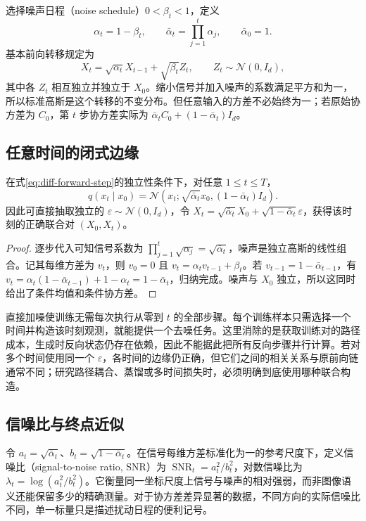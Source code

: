 \documentclass[UTF8,12pt,a4paper,fontset=fandol]{ctexart}
\begin{document}
选择噪声日程（noise schedule）$0<\beta_t<1$，定义
\begin{equation}
 \alpha_t=1-\beta_t,\qquad \bar\alpha_t=\prod_{j=1}^{t}\alpha_j,\qquad \bar\alpha_0=1.
 \label{eq:diff-schedule}
\end{equation}
基本前向转移规定为
\begin{equation}
 X_t=\sqrt{\alpha_t}X_{t-1}+\sqrt{\beta_t}Z_t,
 \qquad Z_t\sim\mathcal N(0,I_d),
 \label{eq:diff-forward-step}
\end{equation}
其中各 $Z_t$ 相互独立并独立于 $X_0$。缩小信号并加入噪声的系数满足平方和为一，所以标准高斯是这个转移的不变分布。但任意输入的方差不必始终为一；若原始协方差为 $C_0$，第 $t$ 步协方差实际为 $\bar\alpha_t C_0+(1-\bar\alpha_t)I_d$。

\subsection{任意时间的闭式边缘}
\begin{proposition}[直接加噪公式]
\label{prop:diff-forward-marginal}
在式\eqref{eq:diff-forward-step}的独立性条件下，对任意 $1\leq t\leq T$，
\begin{equation}
 q(x_t\mid x_0)=\mathcal N(x_t;\sqrt{\bar\alpha_t}x_0,(1-\bar\alpha_t)I_d).
 \label{eq:diff-forward-marginal}
\end{equation}
因此可直接抽取独立的 $\varepsilon\sim\mathcal N(0,I_d)$，令 $X_t=\sqrt{\bar\alpha_t}X_0+\sqrt{1-\bar\alpha_t}\varepsilon$，获得该时刻的正确联合对 $(X_0,X_t)$。
\end{proposition}
\begin{proof}
逐步代入可知信号系数为 $\prod_{j=1}^{t}\sqrt{\alpha_j}=\sqrt{\bar\alpha_t}$，噪声是独立高斯的线性组合。记其每维方差为 $v_t$，则 $v_0=0$ 且 $v_t=\alpha_t v_{t-1}+\beta_t$。若 $v_{t-1}=1-\bar\alpha_{t-1}$，有 $v_t=\alpha_t(1-\bar\alpha_{t-1})+1-\alpha_t=1-\bar\alpha_t$，归纳完成。噪声与 $X_0$ 独立，所以这同时给出了条件均值和条件协方差。
\end{proof}

直接加噪使训练无需每次执行从零到 $t$ 的全部步骤。每个训练样本只需选择一个时间并构造该时刻观测，就能提供一个去噪任务。这里消除的是获取训练对的路径成本，生成时反向状态仍存在依赖，因此不能据此把所有反向步骤并行计算。若对多个时间使用同一个 $\varepsilon$，各时间的边缘仍正确，但它们之间的相关关系与原前向链通常不同；研究路径耦合、蒸馏或多时间损失时，必须明确到底使用哪种联合构造。

\subsection{信噪比与终点近似}
令 $a_t=\sqrt{\bar\alpha_t}$、$b_t=\sqrt{1-\bar\alpha_t}$。在信号每维方差标准化为一的参考尺度下，定义信噪比（signal-to-noise ratio, SNR）为 $\operatorname{SNR}_t=a_t^2/b_t^2$，对数信噪比为 $\lambda_t=\log(a_t^2/b_t^2)$。它衡量同一坐标尺度上信号与噪声的相对强弱，而非图像语义还能保留多少的精确测量。对于协方差差异显著的数据，不同方向的实际信噪比不同，单一标量只是描述扰动日程的便利记号。
\end{document}

